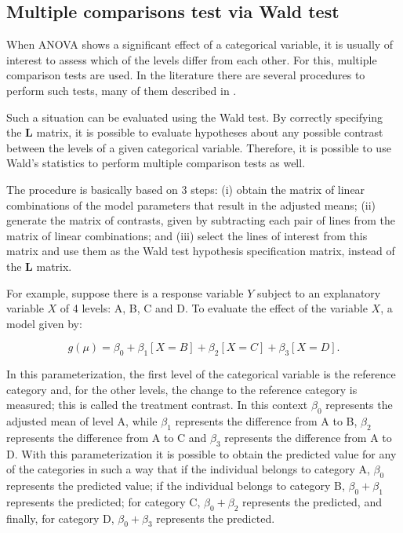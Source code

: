 \documentclass[article]{jss}\usepackage[]{graphicx}\usepackage[]{xcolor}
\begin{document}
\subsection{Multiple comparisons test via Wald test}

When ANOVA shows a significant effect of a categorical variable, it is usually of interest to assess which of the levels differ from each other. For this, multiple comparison tests are used. In the literature there are several procedures to perform such tests, many of them described in \citet{hsu1996multiple}.

Such a situation can be evaluated using the Wald test. By correctly specifying the $\boldsymbol{L}$ matrix, it is possible to evaluate hypotheses about any possible contrast between the levels of a given categorical variable. Therefore, it is possible to use Wald's statistics to perform multiple comparison tests as well.

The procedure is basically based on 3 steps: (i) obtain the matrix of linear combinations of the model parameters that result in the adjusted means; (ii) generate the matrix of contrasts, given by subtracting each pair of lines from the matrix of linear combinations; and (iii) select the lines of interest from this matrix and use them as the Wald test hypothesis specification matrix, instead of the $\boldsymbol{L}$ matrix.
	
For example, suppose there is a response variable $Y$ subject to an explanatory variable $X$ of 4 levels: A, B, C and D. To evaluate the effect of the variable $X$, a model given by:

$$g(\mu) = \beta_0 + \beta_1[X=B] + \beta_2[X=C] + \beta_3[X=D].$$

\noindent In this parameterization, the first level of the categorical variable is the reference category and, for the other levels, the change to the reference category is measured; this is called the treatment contrast. In this context $\beta_0$ represents the adjusted mean of level A, while $\beta_1$ represents the difference from A to B, $\beta_2$ represents the difference from A to C and $\beta_3$ represents the difference from A to D. With this parameterization it is possible to obtain the predicted value for any of the categories in such a way that if the individual belongs to category A, $\beta_0$ represents the predicted value; if the individual belongs to category B, $\beta_0 + \beta_1$ represents the predicted; for category C, $\beta_0 + \beta_2$ represents the predicted, and finally, for category D, $\beta_0 + \beta_3$ represents the predicted.
\end{document}

